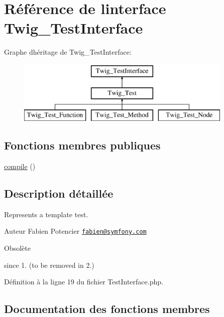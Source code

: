 \hypertarget{interface_twig___test_interface}{}\section{Référence de l\textquotesingle{}interface Twig\+\_\+\+Test\+Interface}
\label{interface_twig___test_interface}
Graphe d\textquotesingle{}héritage de Twig\+\_\+\+Test\+Interface\+:\begin{figure}[H]
\begin{center}
\leavevmode
\includegraphics[height=3.000000cm]{interface_twig___test_interface}
\end{center}
\end{figure}
\subsection*{Fonctions membres publiques}
\begin{DoxyCompactItemize}
\item 
\hyperlink{interface_twig___test_interface_a3815e7c2e73f00c2ebffcf5b90eef3b1}{compile} ()
\end{DoxyCompactItemize}


\subsection{Description détaillée}
Represents a template test.

\begin{DoxyAuthor}{Auteur}
Fabien Potencier \href{mailto:fabien@symfony.com}{\tt fabien@symfony.\+com}
\end{DoxyAuthor}
\begin{DoxyRefDesc}{Obsolète}
\item[\hyperlink{deprecated__deprecated000042}{Obsolète}]since 1. (to be removed in 2.) \end{DoxyRefDesc}


Définition à la ligne 19 du fichier Test\+Interface.\+php.



\subsection{Documentation des fonctions membres}
